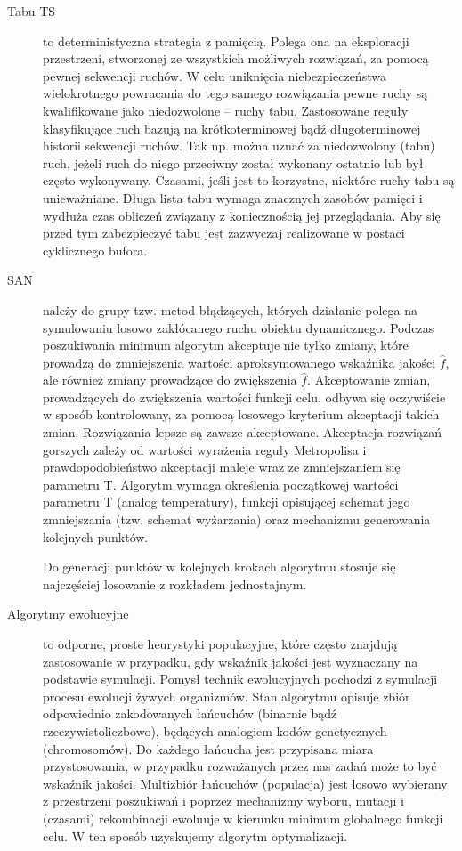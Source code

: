 \begin{description}
\begin{description}
        \item[Tabu TS] to deterministyczna strategia z pamięcią. Polega ona na eksploracji przestrzeni, stworzonej ze wszystkich możliwych rozwiązań, za pomocą pewnej sekwencji ruchów. W celu uniknięcia niebezpieczeństwa wielokrotnego powracania do tego samego rozwiązania pewne ruchy są kwalifikowane jako niedozwolone – ruchy tabu. Zastosowane reguły klasyfikujące ruch bazują na krótkoterminowej bądź długoterminowej historii sekwencji ruchów. Tak np. można uznać za niedozwolony (tabu) ruch, jeżeli ruch do niego przeciwny został wykonany ostatnio lub był często wykonywany. Czasami, jeśli jest to korzystne, niektóre ruchy tabu są unieważniane. Długa lista tabu wymaga znacznych zasobów pamięci i wydłuża czas obliczeń związany z koniecznością jej przeglądania. Aby się przed tym zabezpieczyć tabu jest zazwyczaj realizowane w postaci cyklicznego bufora.
        \item[SAN] należy do grupy tzw. metod błądzących, których działanie polega na symulowaniu losowo zakłócanego ruchu obiektu dynamicznego. Podczas poszukiwania minimum algorytm akceptuje nie tylko zmiany, które prowadzą do zmniejszenia wartości aproksymowanego wskaźnika jakości $\hat{f}$, ale również zmiany prowadzące do zwiększenia $\hat{f}$. Akceptowanie zmian, prowadzących do zwiększenia wartości funkcji celu, odbywa się oczywiście w sposób kontrolowany, za pomocą losowego kryterium akceptacji takich zmian. Rozwiązania lepsze są zawsze akceptowane. Akceptacja rozwiązań gorszych zależy od wartości wyrażenia reguły Metropolisa i prawdopodobieństwo akceptacji maleje wraz ze zmniejszaniem się parametru T. Algorytm wymaga określenia początkowej wartości parametru T (analog temperatury), funkcji opisującej schemat jego zmniejszania (tzw. schemat wyżarzania) oraz mechanizmu generowania kolejnych punktów.
        
        Do generacji punktów w kolejnych krokach algorytmu stosuje się najczęściej losowanie z rozkładem jednostajnym.
        \item[Algorytmy ewolucyjne] to odporne, proste heurystyki populacyjne, które często znajdują zastosowanie w przypadku, gdy wskaźnik jakości jest wyznaczany na podstawie symulacji. Pomysł technik ewolucyjnych pochodzi z symulacji procesu ewolucji żywych organizmów. Stan algorytmu opisuje zbiór odpowiednio zakodowanych łańcuchów (binarnie bądź rzeczywistoliczbowo), będących analogiem kodów genetycznych (chromosomów). Do każdego łańcucha jest przypisana miara przystosowania, w przypadku rozważanych przez nas zadań może to być wskaźnik jakości. Multizbiór łańcuchów (populacja) jest losowo wybierany z przestrzeni poszukiwań i poprzez mechanizmy wyboru, mutacji i (czasami) rekombinacji ewoluuje w kierunku minimum globalnego funkcji celu. W ten sposób uzyskujemy algorytm optymalizacji.
        

\end{description}
\end{description}
